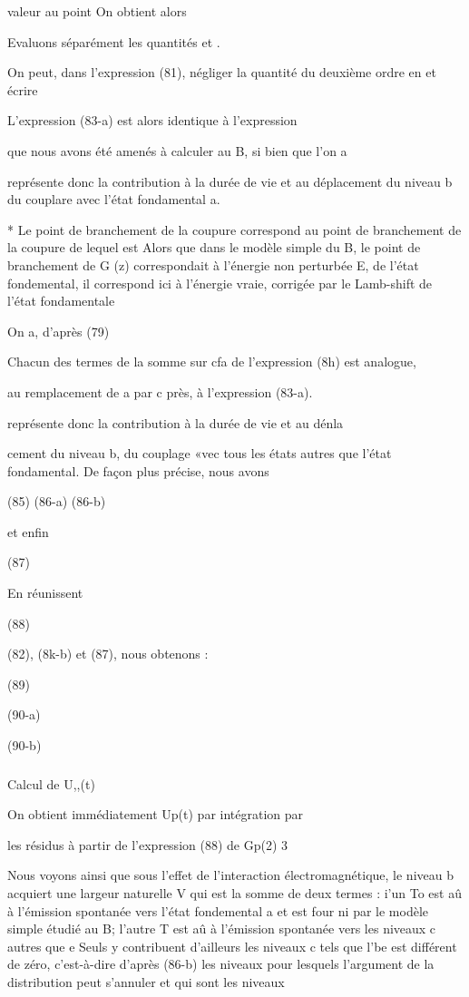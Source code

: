 valeur au point  On obtient alors

Evaluons séparément les quantités  et .

On peut, dans l'expression (81), négliger la quantité du
deuxième ordre en  et écrire

L'expression (83-a) est alors identique à l'expression

que nous avons été amenés à calculer au  B, si bien que l'on a

représente donc la contribution à la durée de vie et au déplacement du niveau b du couplare avec l’état fondamental a.

* Le point de branchement de la coupure correspond au point de branchement de
la coupure de  lequel est Alors que dans le modèle simple
du  B, le point de branchement de G (z) correspondait à l'énergie non perturbée
E, de l'état fondemental, il correspond ici à l'énergie vraie, corrigée par le
Lamb-shift de l'état fondamentale


On a, d'après (79)

Chacun des termes de la somme sur cfa de l'expression (8h) est analogue,

au remplacement de a par c près, à l'expression (83-a).

représente donc la contribution à la durée de vie et au dénla

cement du niveau b, du couplage «vec tous les états  autres que l'état fondamental.
De façon plus précise, nous avons

(85)
(86-a)
(86-b)

et enfin

(87)

En réunissent

(88)

(82), (8k-b) et (87), nous obtenons :

(89)

(90-a)

(90-b)


\subsubsection{} Calcul de U,,(t)%

On obtient immédiatement Up(t) par intégration par

les résidus à partir de l'expression (88) de Gp(2) 3

Nous voyons ainsi que sous l'effet de l'interaction électromagnétique, le niveau b acquiert une largeur naturelle V qui est la somme de
deux termes :
i'un To est aû à l'émission spontanée vers l'état fondemental a et est four
ni par le modèle simple étudié au  B;
l'autre T est aû à l'émission spontanée vers les niveaux c autres que e
Seuls y contribuent d'ailleurs les niveaux c tels que l'be est différent de
zéro, c'est-à-dire d'après (86-b) les niveaux pour lesquels l'argument de la
distribution   peut s'annuler et qui sont les niveaux

